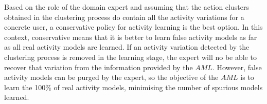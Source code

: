 Based on the role of the domain expert and assuming that the action clusters obtained in the clustering process do contain all the activity variations for a concrete user, a conservative policy for activity learning is the best option. In this context, conservative means that it is better to learn false activity models as far as all real activity models are learned. If an activity variation detected by the clustering process is removed in the learning stage, the expert will no be able to recover that variation from the information provided by the $AML$. However, false activity models can be purged by the expert, so the objective of the $AML$ is to learn the 100\% of real activity models, minimising the number of spurious models learned. 


